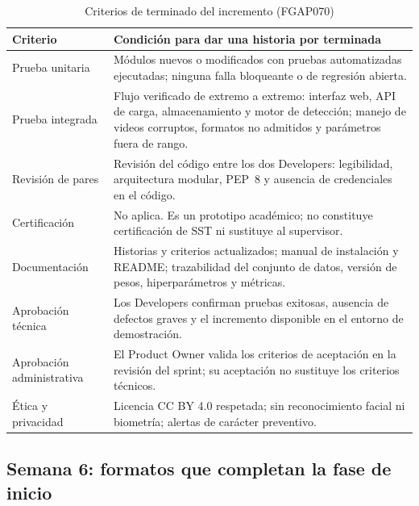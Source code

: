 \documentclass[12pt,a4paper]{article}
\newenvironment{tablaapa}{\small\singlespacing\renewcommand{\arraystretch}{1.25}}{}
\begin{document}
\begin{table}[!htbp]
\caption{Criterios de terminado del incremento (FGAP070)}\label{tab:dod}
\begin{tablaapa}
\begin{tabularx}{\textwidth}{P{3.0cm} L}
\toprule
Criterio & Condición para dar una historia por terminada\\
\midrule
Prueba unitaria & Módulos nuevos o modificados con pruebas automatizadas ejecutadas; ninguna falla bloqueante o de regresión abierta.\\
Prueba integrada & Flujo verificado de extremo a extremo: interfaz web, API de carga, almacenamiento y motor de detección; manejo de videos corruptos, formatos no admitidos y parámetros fuera de rango.\\
Revisión de pares & Revisión del código entre los dos Developers: legibilidad, arquitectura modular, PEP~8 y ausencia de credenciales en el código.\\
Certificación & No aplica. Es un prototipo académico; no constituye certificación de SST ni sustituye al supervisor.\\
Documentación & Historias y criterios actualizados; manual de instalación y README; trazabilidad del conjunto de datos, versión de pesos, hiperparámetros y métricas.\\
Aprobación técnica & Los Developers confirman pruebas exitosas, ausencia de defectos graves y el incremento disponible en el entorno de demostración.\\
Aprobación administrativa & El Product Owner valida los criterios de aceptación en la revisión del sprint; su aceptación no sustituye los criterios técnicos.\\
Ética y privacidad & Licencia CC BY 4.0 respetada; sin reconocimiento facial ni biometría; alertas de carácter preventivo.\\
\bottomrule
\end{tabularx}
\end{tablaapa}
\end{table}




\FloatBarrier
\subsection{Semana 6: formatos que completan la fase de inicio}
\end{document}
